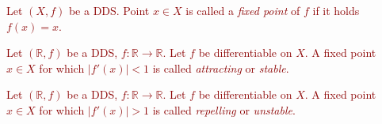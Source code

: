 \begin{definition}
\label{def:fixed point}
    \textcolor{darkred}{
    Let $\left( X, f \right)$ be a DDS. Point $x \in X$ is called a \emph{fixed point} of $f$ if it holds $f(x) = x$.
    }
\end{definition}

\begin{definition}
\label{def:sfp}
    \textcolor{darkred}{
    Let $\left(\mathbb{R}, f\right)$ be a DDS, $f:\mathbb{R} \rightarrow \mathbb{R}$.
    Let $f$ be differentiable on $X$. 
    A fixed point $x \in X$ for which  $|f'(x)| < 1$ is called \emph{attracting} or \emph{stable}.
    }
\end{definition}

\begin{definition}
\label{def:ufp}
    \textcolor{darkred}{
    Let $\left(\mathbb{R}, f\right)$ be a DDS, $f:\mathbb{R} \rightarrow \mathbb{R}$. 
    Let $f$ be differentiable on $X$. 
    A fixed point $x \in X$ for which $|f'(x)| > 1$ is called \emph{repelling} or \emph{unstable}.
    }
\end{definition}

